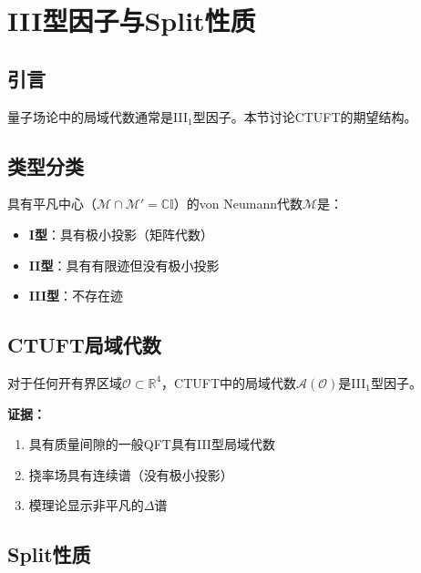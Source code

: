 \section{III型因子与Split性质}
\label{sec:type_III}

\subsection{引言}

量子场论中的局域代数通常是III$_1$型因子。本节讨论CTUFT的期望结构。

\subsection{类型分类}

\begin{definition}[因子类型]
具有平凡中心（$\mathcal{M} \cap \mathcal{M}' = \mathbb{C}\mathbb{I}$）的von Neumann代数$\mathcal{M}$是：
\begin{itemize}
    \item \textbf{I型}：具有极小投影（矩阵代数）
    \item \textbf{II型}：具有有限迹但没有极小投影
    \item \textbf{III型}：不存在迹
\end{itemize}
\end{definition}

\subsection{CTUFT局域代数}

\begin{conjecture}
对于任何开有界区域$\mathcal{O} \subset \mathbb{R}^4$，CTUFT中的局域代数$\mathcal{A}(\mathcal{O})$是III$_1$型因子。
\end{conjecture}

\textbf{证据：}
\begin{enumerate}
    \item 具有质量间隙的一般QFT具有III型局域代数
    \item 挠率场具有连续谱（没有极小投影）
    \item 模理论显示非平凡的$\Delta$谱
\end{enumerate}

\subsection{Split性质}

